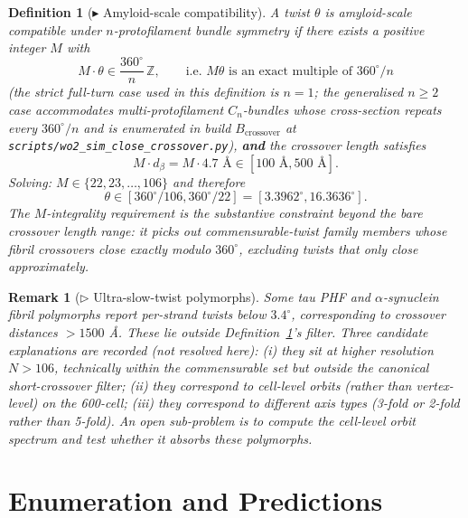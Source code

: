 \documentclass[12pt]{article}
\newtheorem{definition}[theorem]{Definition}
\newtheorem{remark}[theorem]{Remark}
\begin{document}
\begin{definition}[$\blacktriangleright$ Amyloid-scale compatibility]\label{def:D3}
A twist $\theta$ is \emph{amyloid-scale compatible under
$n$-protofilament bundle symmetry} if there exists a positive
integer $M$ with
\[
M \cdot \theta \in \frac{360^{\circ}}{n}\,\mathbb{Z}, \qquad
\text{i.e. } M\theta\text{ is an exact multiple of } 360^{\circ}/n
\]
(the strict full-turn case used in this definition is $n = 1$;
the generalised $n \ge 2$ case accommodates multi-protofilament
$C_n$-bundles whose cross-section repeats every $360^{\circ}/n$
and is enumerated in build $B_{\mathrm{crossover}}$ at
\texttt{scripts/wo2\_sim\_close\_crossover.py}), \textbf{and} the
crossover length satisfies
\[
M \cdot d_\beta = M \cdot 4.7 \text{ \AA} \in [100 \text{ \AA}, 500 \text{ \AA}].
\]
Solving: $M \in \{22, 23, \ldots, 106\}$ and therefore
\[
\theta \in [360^{\circ}/106, 360^{\circ}/22] = [3.3962^{\circ}, 16.3636^{\circ}].
\]
The $M$-integrality requirement is the substantive constraint
beyond the bare crossover length range: it picks out
commensurable-twist family members whose fibril crossovers close
\emph{exactly} modulo $360^{\circ}$, excluding twists that only
close approximately.
\end{definition}

\begin{remark}[$\triangleright$ Ultra-slow-twist polymorphs]\label{rem:R2}
Some tau PHF and $\alpha$-synuclein fibril polymorphs report
per-strand twists below $3.4^{\circ}$, corresponding to
crossover distances $> 1500$ \AA. These lie outside
Definition~\ref{def:D3}'s filter. Three candidate explanations
are recorded (not resolved here): (i) they sit at higher
resolution $N > 106$, technically within the commensurable set
but outside the canonical short-crossover filter; (ii) they
correspond to cell-level orbits (rather than vertex-level) on
the 600-cell; (iii) they correspond to different axis types
(3-fold or 2-fold rather than 5-fold). An open sub-problem is
to compute the cell-level orbit spectrum and test whether it
absorbs these polymorphs.
\end{remark}

\section{Enumeration and Predictions}\label{sec:enum}
\end{document}
